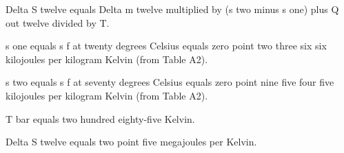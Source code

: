 Delta S twelve equals Delta m twelve multiplied by (s two minus s one) plus Q out twelve divided by T.  

s one equals s f at twenty degrees Celsius equals zero point two three six six kilojoules per kilogram Kelvin (from Table A2).  

s two equals s f at seventy degrees Celsius equals zero point nine five four five kilojoules per kilogram Kelvin (from Table A2).  

T bar equals two hundred eighty-five Kelvin.  

Delta S twelve equals two point five megajoules per Kelvin.
